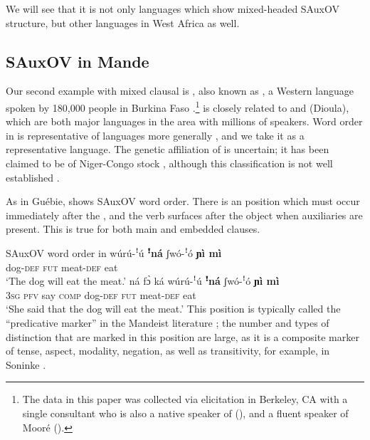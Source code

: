\documentclass[output=paper,newtxmath,modfonts,nonflat,draftmode]{langsci/langscibook}
\begin{document}
We will see that it is not only  languages which show mixed-headed SAuxOV structure, but other languages in West Africa as well.

\subsection{SAuxOV in Mande}\label{sec:Mande}

Our second example with mixed clausal  is , also known as , a Western  language spoken by 180,000 people in Burkina Faso \citep{prost77,diallo88}.\footnote{The  data in this paper was collected via elicitation in Berkeley, CA with a single consultant who is also a native speaker of  (), and a fluent speaker of Mooré ().}  is closely related to  and  (Dioula), which are both major  languages in the area with millions of speakers. Word order in  is representative of  languages more generally \citep[e.g.][]{Creissels2005typology, nikitina11}, and we take it as a representative language. The genetic affiliation of  is uncertain; it has been claimed to be of Niger-Congo stock \citep{Greenberg:1966}, although this classification is not well established \citep{Dimmendaal:2008}.

As in Guébie,  shows SAuxOV word order. There is an  position which must occur immediately after the , and the verb surfaces after the object when auxiliaries are present. This is true for both main and embedded clauses.

\ea SAuxOV word order in  \label{ex:7:dafing}
\ea \gll wúrú-ꜝú \textbf{ꜝ{ná}} {ʃwó-ꜝó} \textbf{{ɲì mì}}  \\
{dog}-\textsc{def} \textsc{fut} meat-\textsc{def} eat\\
\glt `The dog will eat the meat.' \label{ex:7a:dafing}
\ex {} ná {f{\`ɔ}} ká wúrú-ꜝú \textbf{ꜝ{ná}} {ʃwó-ꜝó} \textbf{{ɲì mì}}  \\
\textsc{3sg} \textsc{pfv} say \textsc{comp} {dog}-\textsc{def} \textsc{fut} meat-\textsc{def} eat\\
\glt `She said that the dog will eat the meat.' \label{ex:7b:dafing}
\z
\z
This  position is typically called the ``predicative marker'' in the Mandeist literature \citep[e.g.][]{idiatov2000,creissels2019}; the number and types of distinction that are marked in this position are large, as it is a composite marker of {tense}, {aspect}, modality, negation, as well as transitivity, for example, in Soninke \cite[][]{creissels2017}. 
\end{document}
